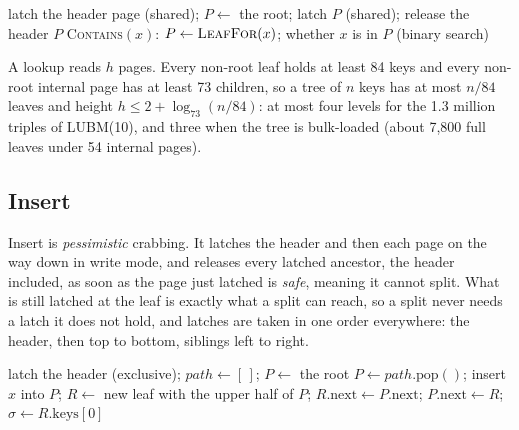 \begin{algorithm}[t]
\caption{\textsc{LeafFor}$(x)$ and \textsc{Contains}$(x)$}\label{alg-search}
\small
latch the header page (shared); $P \gets$ the root; 
latch $P$ (shared); release the header\;
\Return $P$\;
\medskip
\textsc{Contains}$(x)$: $P \gets \textsc{LeafFor}(x)$; \Return whether $x$ is in $P$ (binary search)\;
\end{algorithm}

A lookup reads $h$ pages.
Every non-root leaf holds at least 84 keys and every non-root internal page
has at least 73 children, so a tree of $n$ keys has at most $n/84$ leaves
and height $h \le 2 + \log_{73}(n/84)$: at most four levels for the 1.3
million triples of LUBM(10), and three when the tree is bulk-loaded (about
7,800 full leaves under 54 internal pages).

\subsection{Insert}

Insert is \emph{pessimistic} crabbing.
It latches the header and then each page on the way down in write mode, and
releases every latched ancestor, the header included, as soon as the page
just latched is \emph{safe}, meaning it cannot split.
What is still latched at the leaf is exactly what a split can reach, so a
split never needs a latch it does not hold, and latches are taken in one
order everywhere: the header, then top to bottom, siblings left to right.

\begin{algorithm}[t]
\caption{\textsc{Insert}$(x)$}\label{alg-insert}
\small
latch the header (exclusive); 
$\mathit{path} \gets [\,]$; $P \gets$ the root\;
$P \gets \mathit{path}.\text{pop}()$; 
insert $x$ into $P$; 
$R \gets$ new leaf with the upper half of $P$; $R.\text{next} \gets P.\text{next}$; $P.\text{next} \gets R$; $\sigma \gets R.\text{keys}[0]$\;
\end{algorithm}

